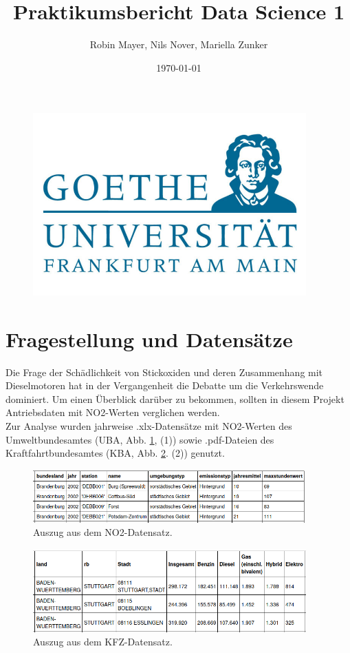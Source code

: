 \documentclass[11pt,a4paper,oneside,german]{article}
\title{Praktikumsbericht Data Science 1}
\author{Robin Mayer, Nils Nover, Mariella Zunker}
\date{\today}
\begin{document}
	\maketitle
	
	\begin{figure}[h]
		\centering
		\includegraphics[width=10.5cm]{uniemblem.jpg}		
	\end{figure}
	
	\newpage
	
	\tableofcontents
	
	\section{Fragestellung und Datensätze}
	
	Die Frage der Schädlichkeit von Stickoxiden und deren Zusammenhang mit Dieselmotoren hat in der Vergangenheit die Debatte um die Verkehrswende dominiert. Um einen Überblick darüber zu bekommen, sollten in diesem Projekt Antriebsdaten mit NO2-Werten verglichen werden. \\
	Zur Analyse wurden jahrweise .xlx-Datensätze mit NO2-Werten des Umweltbundesamtes (UBA, Abb. \ref{fig:BeispielNO2}, (1)) sowie .pdf-Dateien des Kraftfahrtbundesamtes (KBA, Abb. \ref{fig:BeispielKFZ}. (2)) genutzt.
	
	\begin{figure}[h!]
		\centering
		\includegraphics[width=10.5cm]{BeispielNO2.png}
		\caption{Auszug aus dem NO2-Datensatz.}
		\label{fig:BeispielNO2}
	\end{figure}
	
	\begin{figure}[h!]
		\centering
		\includegraphics[width=10.5cm]{BeispielKFZ.png}
		\caption{Auszug aus dem KFZ-Datensatz.}
		\label{fig:BeispielKFZ}
	\end{figure}
	
\end{document}
